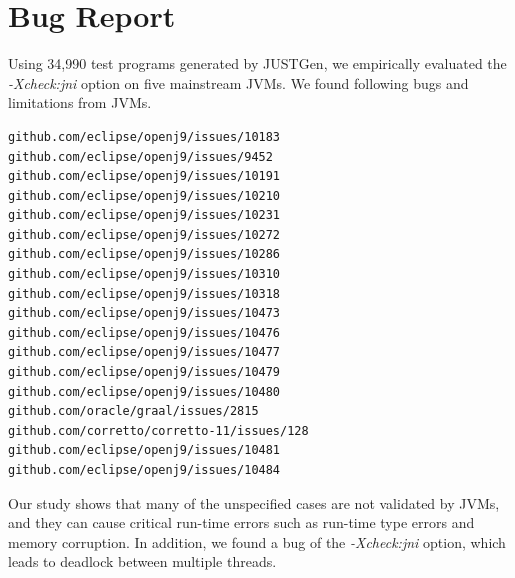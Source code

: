 \documentclass[conference]{IEEEtran}
\begin{document}
\section{Bug Report}
Using 34,990 test programs generated by JUSTGen, 
we empirically evaluated the \textit{-Xcheck:jni} option on five mainstream JVMs.
We found following bugs and limitations from JVMs.

\begin{lstlisting}
github.com/eclipse/openj9/issues/10183
github.com/eclipse/openj9/issues/9452
github.com/eclipse/openj9/issues/10191
github.com/eclipse/openj9/issues/10210
github.com/eclipse/openj9/issues/10231
github.com/eclipse/openj9/issues/10272
github.com/eclipse/openj9/issues/10286
github.com/eclipse/openj9/issues/10310
github.com/eclipse/openj9/issues/10318
github.com/eclipse/openj9/issues/10473
github.com/eclipse/openj9/issues/10476
github.com/eclipse/openj9/issues/10477
github.com/eclipse/openj9/issues/10479
github.com/eclipse/openj9/issues/10480
github.com/oracle/graal/issues/2815
github.com/corretto/corretto-11/issues/128
github.com/eclipse/openj9/issues/10481
github.com/eclipse/openj9/issues/10484
\end{lstlisting}

Our study shows that many of the unspecified cases are not validated by JVMs, 
and they can cause critical run-time errors such as run-time type errors and memory corruption. 
In addition, we found a bug of the \textit{-Xcheck:jni} option, 
which leads to deadlock between multiple threads.
\end{document}
